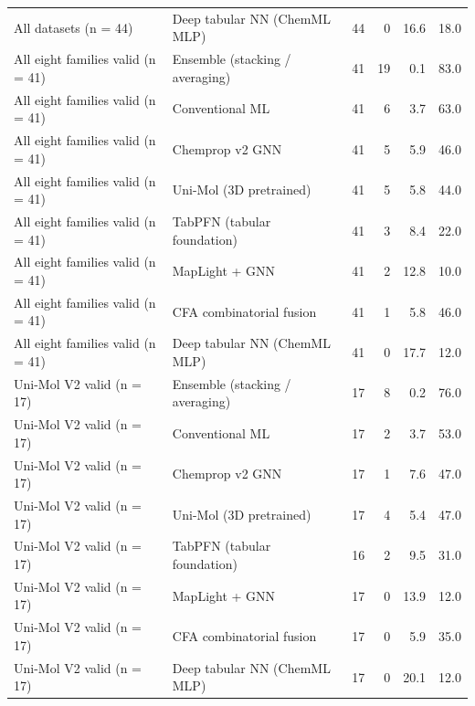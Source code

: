 \begin{xltabular}{\textwidth}{@{}>{\raggedright\arraybackslash{}\hsize}X>{\raggedright\arraybackslash{}\hsize}Xrrrr@{}}
All datasets (n = 44) & Deep tabular NN (ChemML MLP) & 44 & 0 & 16.6 & 18.0 \\
All eight families valid (n = 41) & Ensemble (stacking /\allowbreak{} averaging) & 41 & 19 & 0.1 & 83.0 \\
All eight families valid (n = 41) & Conventional ML & 41 & 6 & 3.7 & 63.0 \\
All eight families valid (n = 41) & Chemprop v2 GNN & 41 & 5 & 5.9 & 46.0 \\
All eight families valid (n = 41) & Uni-\allowbreak{}Mol (3D pretrained) & 41 & 5 & 5.8 & 44.0 \\
All eight families valid (n = 41) & TabPFN (tabular foundation) & 41 & 3 & 8.4 & 22.0 \\
All eight families valid (n = 41) & Map\allowbreak{}Light + GNN & 41 & 2 & 12.8 & 10.0 \\
All eight families valid (n = 41) & CFA combinatorial fusion & 41 & 1 & 5.8 & 46.0 \\
All eight families valid (n = 41) & Deep tabular NN (ChemML MLP) & 41 & 0 & 17.7 & 12.0 \\
Uni-\allowbreak{}Mol V2 valid (n = 17) & Ensemble (stacking /\allowbreak{} averaging) & 17 & 8 & 0.2 & 76.0 \\
Uni-\allowbreak{}Mol V2 valid (n = 17) & Conventional ML & 17 & 2 & 3.7 & 53.0 \\
Uni-\allowbreak{}Mol V2 valid (n = 17) & Chemprop v2 GNN & 17 & 1 & 7.6 & 47.0 \\
Uni-\allowbreak{}Mol V2 valid (n = 17) & Uni-\allowbreak{}Mol (3D pretrained) & 17 & 4 & 5.4 & 47.0 \\
Uni-\allowbreak{}Mol V2 valid (n = 17) & TabPFN (tabular foundation) & 16 & 2 & 9.5 & 31.0 \\
Uni-\allowbreak{}Mol V2 valid (n = 17) & Map\allowbreak{}Light + GNN & 17 & 0 & 13.9 & 12.0 \\
Uni-\allowbreak{}Mol V2 valid (n = 17) & CFA combinatorial fusion & 17 & 0 & 5.9 & 35.0 \\
Uni-\allowbreak{}Mol V2 valid (n = 17) & Deep tabular NN (ChemML MLP) & 17 & 0 & 20.1 & 12.0 \\
\end{xltabular}
\endgroup
